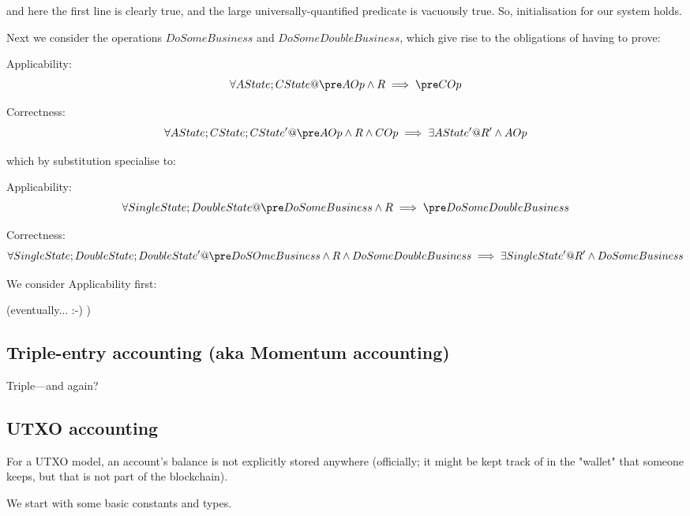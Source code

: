 \documentclass[11pt]{amsart}
\begin{document}
and here the first line is clearly true, and the large universally-quantified predicate is vacuously true. So, initialisation for our system holds.

Next we consider the operations $DoSomeBusiness$ and $DoSomeDoubleBusiness$, which give rise to the obligations of having to prove:

\noindent Applicability:
\[
\forall AState; CState @ \pre AOp \land R \implies \pre COp
\]

\noindent Correctness:
\[
\forall AState; CState; CState' @ \pre AOp \land R \land COp \implies \exists AState' @ R' \land AOp
\]

which by substitution specialise to:

\noindent Applicability:
\[
\forall SingleState; DoubleState @ \pre DoSomeBusiness \land R \implies \pre DoSomeDoubleBusiness
\]

\noindent Correctness:
\[
\forall SingleState; DoubleState; DoubleState' @ \pre DoSOmeBusiness \land R \land DoSomeDoubleBusiness \implies \exists SingleState' @ R' \land DoSomeBusiness
\]

We consider Applicability first:

(eventually... :-) )



\subsection{Triple-entry accounting (aka Momentum accounting)}

Triple---and again?

\subsection{UTXO accounting}

For a UTXO model, an account's balance is not explicitly stored anywhere
(officially; it might be kept track of in the "wallet" that someone keeps,
but that is not part of the blockchain).
 
We start with some basic constants and types.



%
%
%
\end{document}
